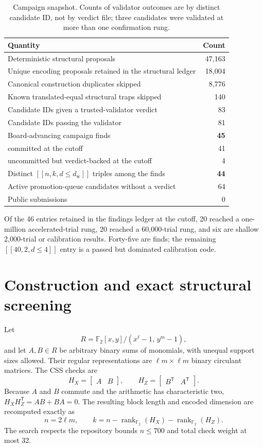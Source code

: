 \documentclass[11pt]{article}
\newcommand{\GF}{\mathbb{F}_2}
\newcommand{\HX}{H_X}
\newcommand{\HZ}{H_Z}
\newcommand{\dw}{d_{\mathrm w}}
\newcommand{\qcode}[3]{\ensuremath{[\![#1,#2,d\!\leq\!#3]\!]}}
\begin{document}
\begin{longtable}{@{}lr@{}}
\caption{Campaign snapshot.  Counts of validator outcomes are by distinct
candidate ID, not by verdict file; three candidates were validated at more
than one confirmation rung.}
\label{tab:snapshot}\\
\toprule
Quantity & Count \\
\midrule
Deterministic structural proposals & 47,163 \\
Unique encoding proposals retained in the structural ledger & 18,004 \\
Canonical construction duplicates skipped & 8,776 \\
Known translated-equal structural traps skipped & 140 \\
Candidate IDs given a trusted-validator verdict & 83 \\
Candidate IDs passing the validator & 81 \\
Board-advancing campaign finds & \textbf{45} \\
\quad committed at the cutoff & 41 \\
\quad uncommitted but verdict-backed at the cutoff & 4 \\
Distinct \qcode{n}{k}{\dw} triples among the finds & \textbf{44} \\
Active promotion-queue candidates without a verdict & 64 \\
Public submissions & 0 \\
\bottomrule
\end{longtable}

Of the 46 entries retained in the findings ledger at the cutoff, 20 reached a
one-million accelerated-trial rung, 20 reached a 60,000-trial rung, and six
are shallow 2,000-trial or calibration results.  Forty-five are finds; the remaining
\qcode{40}{2}{4} entry is a passed but dominated calibration code.

\section{Construction and exact structural screening}

Let
\[
  R=\GF[x,y]/(x^{\ell}-1,\,y^m-1),
\]
and let $A,B\in R$ be arbitrary binary sums of monomials, with unequal support
sizes allowed.  Their regular representations are $\ell m\times\ell m$
binary circulant matrices.  The CSS checks are
\[
  \HX=\begin{bmatrix}A&B\end{bmatrix},\qquad
  \HZ=\begin{bmatrix}B^{\mathsf T}&A^{\mathsf T}\end{bmatrix}.
\]
Because $A$ and $B$ commute and the arithmetic has characteristic two,
$\HX\HZ^{\mathsf T}=AB+BA=0$.  The resulting block length and encoded
dimension are recomputed exactly as
\[
  n=2\ell m,
  \qquad
  k=n-\operatorname{rank}_{\GF}(\HX)
      -\operatorname{rank}_{\GF}(\HZ).
\]
The search respects the repository bounds $n\leq700$ and total check weight
at most 32.
\end{document}
